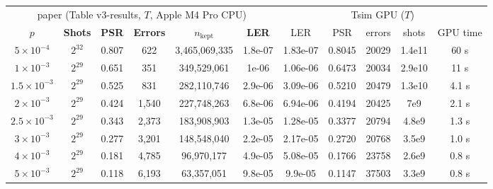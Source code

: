 \begin{tabular}{cccccc|ccccc}
\toprule
\multicolumn{6}{c|}{paper (Table v3-results, $T$, Apple M4 Pro CPU)} & \multicolumn{5}{c}{Tsim GPU ($T$)}\\
$p$ & \textbf{Shots} & \textbf{PSR} & \textbf{Errors} & $n_{\mathrm{kept}}$ & \textbf{LER} & LER & PSR & errors & shots & GPU time\\
\midrule
$5 \times 10^{-4}$ & $2^{32}$ & 0.807 & 622 & 3,465,069,335 & 1.8e-07 & 1.83e-07 & 0.8045 & 20029 & 1.4e11 & 60 s \\
$1 \times 10^{-3}$ & $2^{29}$ & 0.651 & 351 & 349,529,061 & 1e-06 & 1.06e-06 & 0.6473 & 20034 & 2.9e10 & 11 s \\
$1.5 \times 10^{-3}$ & $2^{29}$ & 0.525 & 831 & 282,110,746 & 2.9e-06 & 3.09e-06 & 0.5210 & 20479 & 1.3e10 & 4.1 s \\
$2 \times 10^{-3}$ & $2^{29}$ & 0.424 & 1,540 & 227,748,263 & 6.8e-06 & 6.94e-06 & 0.4194 & 20425 & 7e9 & 2.1 s \\
$2.5 \times 10^{-3}$ & $2^{29}$ & 0.343 & 2,373 & 183,908,903 & 1.3e-05 & 1.28e-05 & 0.3377 & 20794 & 4.8e9 & 1.3 s \\
$3 \times 10^{-3}$ & $2^{29}$ & 0.277 & 3,201 & 148,548,040 & 2.2e-05 & 2.17e-05 & 0.2720 & 20768 & 3.5e9 & 1.0 s \\
$4 \times 10^{-3}$ & $2^{29}$ & 0.181 & 4,785 & 96,970,177 & 4.9e-05 & 5.08e-05 & 0.1766 & 23758 & 2.6e9 & 0.8 s \\
$5 \times 10^{-3}$ & $2^{29}$ & 0.118 & 6,193 & 63,357,051 & 9.8e-05 & 9.9e-05 & 0.1147 & 37503 & 3.3e9 & 0.8 s \\
\bottomrule
\end{tabular}
